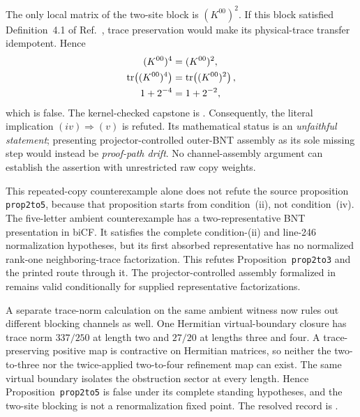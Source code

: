 \documentclass{article}
\begin{document}
The only local matrix of the two-site block is $(K^{00})^2$. If this block
satisfied Definition~4.1 of Ref.~\cite{Cirac2016MPDO_arXiv}, trace preservation
would make its physical-trace transfer idempotent. Hence
\begin{align}
    (K^{00})^4
        &=(K^{00})^2,
    \label{eq:cpgsv17_mpdo_theorem_4_9_implication_label_idempotence}\\
    \operatorname{tr}\!\left((K^{00})^4\right)
        &=\operatorname{tr}\!\left((K^{00})^2\right),
    \label{eq:cpgsv17_mpdo_theorem_4_9_implication_label_trace_idempotence}\\
    1+2^{-4}
        &=1+2^{-2},
    \label{eq:cpgsv17_mpdo_theorem_4_9_implication_label_trace_contradiction}
\end{align}
which is false. The kernel-checked capstone is
.
Consequently, the literal implication $(iv)\Rightarrow(v)$ is refuted. Its
mathematical status is an \emph{unfaithful statement}; presenting
projector-controlled outer-BNT assembly as its sole missing step would instead
be \emph{proof-path drift}. No channel-assembly argument can establish the
assertion with unrestricted raw copy weights.

This repeated-copy counterexample alone does not refute the source proposition
\texttt{prop2to5}, because that proposition starts from condition~(ii), not
condition~(iv). The five-letter ambient counterexample
 has a two-representative BNT presentation
in biCF. It satisfies the complete condition-(ii) and line-246 normalization
hypotheses, but its first absorbed representative has no normalized rank-one
neighboring-trace factorization. This refutes Proposition~\texttt{prop2to3}
and the printed route through it. The projector-controlled assembly formalized
in  remains valid conditionally for supplied representative
factorizations.

A separate trace-norm calculation on the same ambient witness now rules out
different blocking channels as well. One Hermitian virtual-boundary closure
has trace norm $337/250$ at length two and $27/20$ at lengths three and four.
A trace-preserving positive map is contractive on Hermitian matrices, so
neither the two-to-three nor the twice-applied two-to-four refinement map can
exist. The same virtual boundary isolates the obstruction sector at every
length. Hence Proposition~\texttt{prop2to5} is false under its complete
standing hypotheses, and the two-site blocking is not a renormalization fixed
point. The resolved record is
.
\end{document}
